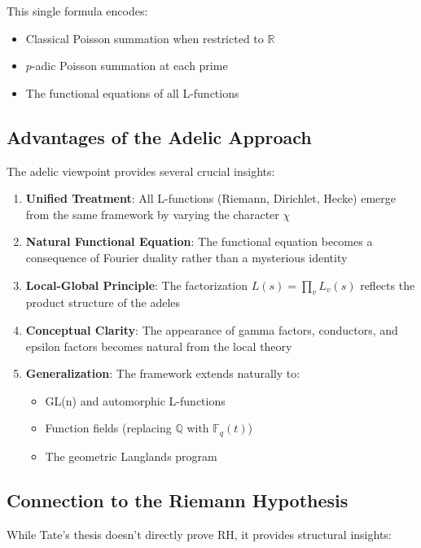 This single formula encodes:
\begin{itemize}
\item Classical Poisson summation when restricted to $\mathbb{R}$
\item $p$-adic Poisson summation at each prime
\item The functional equations of all L-functions
\end{itemize}

\subsection{Advantages of the Adelic Approach}

The adelic viewpoint provides several crucial insights:

\begin{enumerate}
\item \textbf{Unified Treatment}: All L-functions (Riemann, Dirichlet, Hecke) emerge from the same framework by varying the character $\chi$

\item \textbf{Natural Functional Equation}: The functional equation becomes a consequence of Fourier duality rather than a mysterious identity

\item \textbf{Local-Global Principle}: The factorization $L(s) = \prod_v L_v(s)$ reflects the product structure of the adeles

\item \textbf{Conceptual Clarity}: The appearance of gamma factors, conductors, and epsilon factors becomes natural from the local theory

\item \textbf{Generalization}: The framework extends naturally to:
   \begin{itemize}
   \item GL(n) and automorphic L-functions
   \item Function fields (replacing $\mathbb{Q}$ with $\mathbb{F}_q(t)$)
   \item The geometric Langlands program
   \end{itemize}
\end{enumerate}

\subsection{Connection to the Riemann Hypothesis}

While Tate's thesis doesn't directly prove RH, it provides structural insights:

